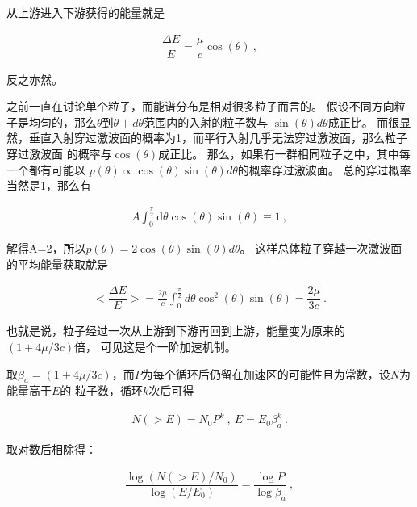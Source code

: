 从上游进入下游获得的能量就是

\begin{equation}
    \begin{aligned}
      \dfrac{\Delta E}{E} = \dfrac{\mu}{c} \cos (\theta)\ ,
    \end{aligned}
\end{equation}

反之亦然。

之前一直在讨论单个粒子，而能谱分布是相对很多粒子而言的。
假设不同方向粒子是均匀的，那么$\theta$到$\theta+d\theta$范围内的入射的粒子数与
$\sin(\theta)d\theta$成正比。
而很显然，垂直入射穿过激波面的概率为1，而平行入射几乎无法穿过激波面，那么粒子穿过激波面
的概率与$\cos(\theta)$成正比。
那么，如果有一群相同粒子之中，其中每一个都有可能以
$p(\theta)\propto \cos(\theta)\sin(\theta)d\theta$的概率穿过激波面。
总的穿过概率当然是1，那么有

\begin{equation}
    \begin{aligned}
      A \int_{0}^{\frac{\pi}{2}} \mathrm{d} \theta \cos
      (\theta) \sin (\theta) \equiv 1\ ,
    \end{aligned}
\end{equation}

解得A=2，所以$p(\theta)=2\cos(\theta)\sin(\theta)d\theta$。
这样总体粒子穿越一次激波面的平均能量获取就是

\begin{equation}
    \begin{aligned}
      <\dfrac{\Delta E}{E}>=\frac{2\mu}{c} \int_{0}^{\frac{\pi}{2}}
      d \theta \cos ^{2}(\theta) \sin (\theta) = \dfrac{2\mu}{3c} \ .
    \end{aligned}
\end{equation}

也就是说，粒子经过一次从上游到下游再回到上游，能量变为原来的$(1+4\mu/3c)$倍，
可见这是个一阶加速机制。

取$\beta_a=(1+4\mu/3c)$，而$P$为每个循环后仍留在加速区的可能性且为常数，设$N$为能量高于$E$的
粒子数，循环$k$次后可得

\begin{equation}
    \begin{aligned}
      N(>E)=N_{0} P^{k}\ ,\  E=E_{0} \beta_a^{k}\ .
    \end{aligned}
\end{equation}

取对数后相除得：

\begin{equation}
    \begin{aligned}
      \dfrac{\log \left(N(>E) / N_{0}\right)}{\log \left(E / E_{0}\right)}=
      \dfrac{\log P}{\log \beta_a} \ ,
    \end{aligned}
\end{equation}

